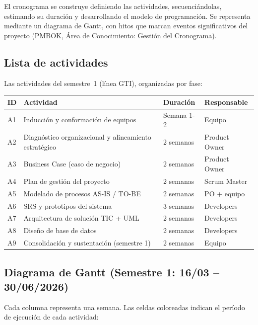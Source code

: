 El cronograma se construye definiendo las actividades, secuenciándolas, estimando su
duración y desarrollando el modelo de programación. Se representa mediante un diagrama
de Gantt, con hitos que marcan eventos significativos del proyecto (PMBOK, Área de
Conocimiento: Gestión del Cronograma).

\subsection{Lista de actividades}

Las actividades del semestre~1 (línea GTI), organizadas por fase:

\begin{center}
\label{tab:actividades}
\begin{tabularx}{\textwidth}{C{1cm} X L{2.4cm} L{2.6cm}}
\toprule
\textbf{ID} & \textbf{Actividad} & \textbf{Duración} & \textbf{Responsable} \\
\midrule
A1 & Inducción y conformación de equipos & Semana 1-2 & Equipo \\
A2 & Diagnóstico organizacional y alineamiento estratégico & 2 semanas & Product Owner \\
A3 & Business Case (caso de negocio) & 2 semanas & Product Owner \\
A4 & Plan de gestión del proyecto & 2 semanas & Scrum Master \\
A5 & Modelado de procesos AS-IS / TO-BE & 2 semanas & PO + equipo \\
A6 & SRS y prototipos del sistema & 3 semanas & Developers \\
A7 & Arquitectura de solución TIC + UML & 2 semanas & Developers \\
A8 & Diseño de base de datos & 2 semanas & Developers \\
A9 & Consolidación y sustentación (semestre 1) & 2 semanas & Equipo \\
\bottomrule
\end{tabularx}
\end{center}

\subsection{Diagrama de Gantt (Semestre 1: 16/03 -- 30/06/2026)}

Cada columna representa una semana. Las celdas coloreadas indican el período de
ejecución de cada actividad:


